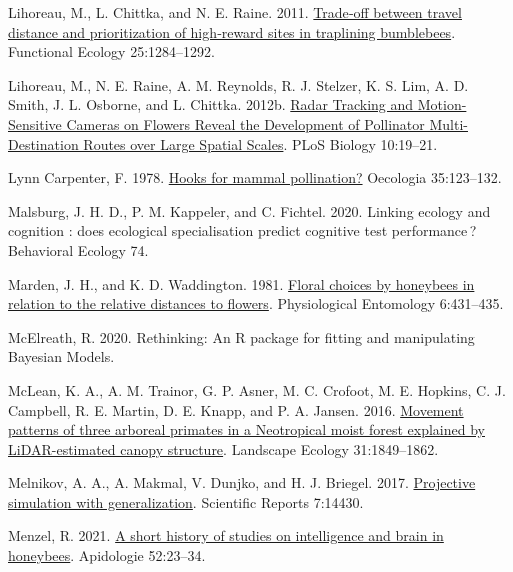 \documentclass[twoside,12pt,final]{ucthesis-CA2012}
\newenvironment{CSLReferences}%
  {}%
  {\par}
\begin{document}
\begin{ucmainmatter}
\begin{CSLReferences}{1}{0}
\leavevmode{}%
Lihoreau, M., L. Chittka, and N. E. Raine. 2011. \href{https://doi.org/10.1111/j.1365-2435.2011.01881.x}{Trade‐off between travel distance and prioritization of high‐reward sites in traplining bumblebees}. Functional Ecology 25:1284--1292.

\leavevmode{}%
Lihoreau, M., N. E. Raine, A. M. Reynolds, R. J. Stelzer, K. S. Lim, A. D. Smith, J. L. Osborne, and L. Chittka. 2012b. \href{https://doi.org/10.1371/journal.pbio.1001392}{Radar Tracking and Motion-Sensitive Cameras on Flowers Reveal the Development of Pollinator Multi-Destination Routes over Large Spatial Scales}. PLoS Biology 10:19--21.

\leavevmode{}%
Lynn Carpenter, F. 1978. \href{https://doi.org/10.1007/BF00344725}{Hooks for mammal pollination?} Oecologia 35:123--132.

\leavevmode{}%
Malsburg, J. H. D., P. M. Kappeler, and C. Fichtel. 2020. Linking ecology and cognition : does ecological specialisation predict cognitive test performance\,? Behavioral Ecology 74.

\leavevmode{}%
Marden, J. H., and K. D. Waddington. 1981. \href{https://doi.org/10.1111/j.1365-3032.1981.tb00658.x}{Floral choices by honeybees in relation to the relative distances to flowers}. Physiological Entomology 6:431--435.

\leavevmode{}%
McElreath, R. 2020. Rethinking: An R package for fitting and manipulating Bayesian Models.

\leavevmode{}%
McLean, K. A., A. M. Trainor, G. P. Asner, M. C. Crofoot, M. E. Hopkins, C. J. Campbell, R. E. Martin, D. E. Knapp, and P. A. Jansen. 2016. \href{https://doi.org/10.1007/s10980-016-0367-9}{Movement patterns of three arboreal primates in a Neotropical moist forest explained by LiDAR-estimated canopy structure}. Landscape Ecology 31:1849--1862.

\leavevmode{}%
Melnikov, A. A., A. Makmal, V. Dunjko, and H. J. Briegel. 2017. \href{https://doi.org/10.1038/s41598-017-14740-y}{Projective simulation with generalization}. Scientific Reports 7:14430.

\leavevmode{}%
Menzel, R. 2021. \href{https://doi.org/10.1007/s13592-020-00794-x}{A short history of studies on intelligence and brain in honeybees}. Apidologie 52:23--34.


\end{CSLReferences}
\end{ucmainmatter}
\end{document}
